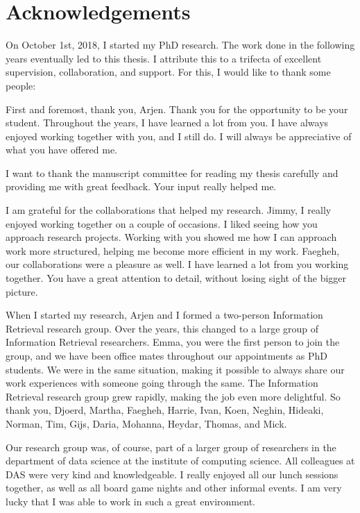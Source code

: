 \chapter*{Acknowledgements}

On October 1st, 2018, I started my PhD research. The work done in the following years eventually led to this thesis. I attribute this to a trifecta of excellent supervision, collaboration, and support. For this, I would like to thank some people:

First and foremost, thank you, Arjen. Thank you for the opportunity to be your student. Throughout the years, I have learned a lot from you. I have always enjoyed working together with you, and I still do. I will always be appreciative of what you have offered me. 

I want to thank the manuscript committee for reading my thesis carefully and providing me with great feedback. Your input really helped me. 

I am grateful for the collaborations that helped my research. Jimmy, I really enjoyed working together on a couple of occasions. I liked seeing how you approach research projects. Working with you showed me how I can approach work more structured, helping me become more efficient in my work. Faegheh, our collaborations were a pleasure as well. I have learned a lot from you working together. You have a great attention to detail, without losing sight of the bigger picture.

When I started my research, Arjen and I formed a two-person Information Retrieval research group. Over the years, this changed to a large group of Information Retrieval researchers. Emma, you were the first person to join the group, and we have been office mates throughout our appointments as PhD students. We were in the same situation, making it possible to always share our work experiences with someone going through the same. The Information Retrieval research group grew rapidly, making the job even more delightful. So thank you, Djoerd, Martha, Faegheh, Harrie, Ivan, Koen, Neghin, Hideaki, Norman, Tim, Gijs, Daria, Mohanna, Heydar, Thomas, and Mick.

Our research group was, of course, part of a larger group of researchers in the department of data science at the institute of computing science. All colleagues at DAS were very kind and knowledgeable. I really enjoyed all our lunch sessions together, as well as all board game nights and other informal events. I am very lucky that I was able to work in such a great environment. 


